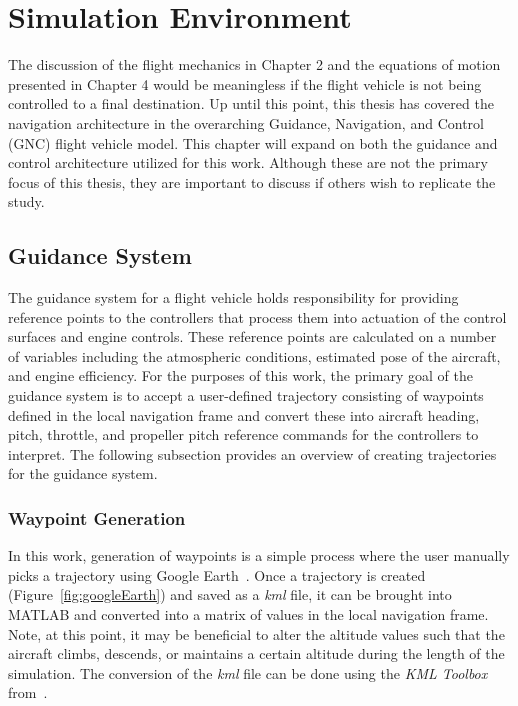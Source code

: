 \chapter{Simulation Environment}
The discussion of the flight mechanics in Chapter 2 and the equations of motion presented in Chapter 4 would be meaningless if the flight vehicle is not being controlled to a final destination. Up until this point, this thesis has covered the navigation architecture in the overarching Guidance, Navigation, and Control (GNC) flight vehicle model. This chapter will expand on both the guidance and control architecture utilized for this work. Although these are not the primary focus of this thesis, they are important to discuss if others wish to replicate the study.

\section{Guidance System}
The guidance system for a flight vehicle holds responsibility for providing reference points to the controllers that process them into actuation of the control surfaces and engine controls. These reference points are calculated on a number of variables including the atmospheric conditions, estimated pose of the aircraft, and engine efficiency. For the purposes of this work, the primary goal of the guidance system is to accept a user-defined trajectory consisting of waypoints defined in the local navigation frame and convert these into aircraft heading, pitch, throttle, and propeller pitch reference commands for the controllers to interpret. The following subsection provides an overview of creating trajectories for the guidance system.

\subsection{Waypoint Generation}
In this work, generation of waypoints is a simple process where the user manually picks a trajectory using Google Earth~\cite{GoogleEarth}. Once a trajectory is created (Figure~\ref{fig:googleEarth}) and saved as a \textit{kml} file, it can be brought into MATLAB and converted into a matrix of values in the local navigation frame. Note, at this point, it may be beneficial to alter the altitude values such that the aircraft climbs, descends, or maintains a certain altitude during the length of the simulation. The conversion of the \textit{kml} file can be done using the \textit{KML Toolbox} from~\cite{KMLToolboxFile}.

